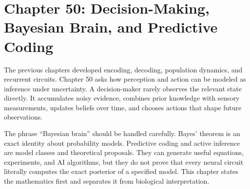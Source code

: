 \section{Chapter 50: Decision-Making, Bayesian Brain, and Predictive Coding}
\label{ch:decision-making-bayesian-brain-predictive-coding}

The previous chapters developed encoding, decoding, population dynamics, and recurrent circuits. Chapter 50 asks how perception and action can be modeled as inference under uncertainty. A decision-maker rarely observes the relevant state directly. It accumulates noisy evidence, combines prior knowledge with sensory measurements, updates beliefs over time, and chooses actions that shape future observations.

The phrase ``Bayesian brain'' should be handled carefully. Bayes' theorem is an exact identity about probability models. Predictive coding and active inference are model classes and theoretical proposals. They can generate useful equations, experiments, and AI algorithms, but they do not prove that every neural circuit literally computes the exact posterior of a specified model. This chapter states the mathematics first and separates it from biological interpretation.

